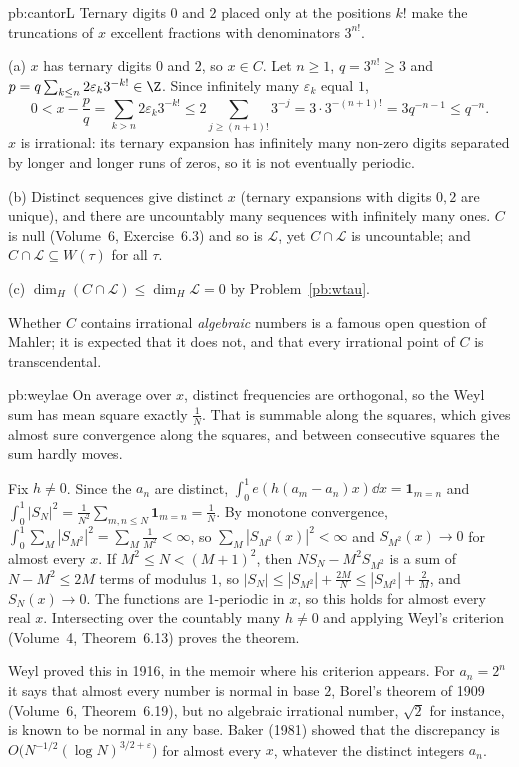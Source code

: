 \begin{solution}{pb:cantorL}
\idea Ternary digits $0$ and $2$ placed only at the positions $k!$ make the truncations of $x$ excellent fractions with denominators $3^{n!}$.

\writeup (a) $x$ has ternary digits $0$ and $2$, so $x\in C$. Let $n\ge1$, $q=3^{n!}\ge3$ and $p=q\sum_{k\le n}2\varepsilon_k3^{-k!}\in\Z$. Since infinitely many $\varepsilon_k$ equal
$1$,
\[
0<x-\frac pq=\sum_{k>n}2\varepsilon_k3^{-k!}\le2\sum_{j\ge(n+1)!}3^{-j}=3\cdot3^{-(n+1)!}=3q^{-n-1}\le q^{-n}.
\]
$x$ is irrational: its ternary expansion has infinitely many non-zero digits separated by longer and longer runs of zeros, so it is not eventually periodic.

(b) Distinct sequences give distinct $x$ (ternary expansions with digits $0,2$ are unique), and there are uncountably many sequences with infinitely many ones. $C$ is null
(Volume~6, Exercise~6.3) and so is $\mathcal L$, yet $C\cap\mathcal L$ is uncountable; and $C\cap\mathcal L\subseteq W(\tau)$ for all $\tau$.

(c) $\dim_H(C\cap\mathcal L)\le\dim_H\mathcal L=0$ by Problem~\ref{pb:wtau}.

\leads Whether $C$ contains irrational \emph{algebraic} numbers is a famous open question of Mahler; it is expected that it does not, and that every irrational point of
$C$ is transcendental.
\end{solution}

\begin{solution}{pb:weylae}
\idea On average over $x$, distinct frequencies are orthogonal, so the Weyl sum has mean square exactly $\frac1N$. That is summable along the squares, which gives
almost sure convergence along the squares, and between consecutive squares the sum hardly moves.

\writeup Fix $h\ne0$. Since the $a_n$ are distinct, $\int_0^1e(h(a_m-a_n)x)\dd x=\mathbf 1_{m=n}$ and $\int_0^1|S_N|^2=\frac1{N^2}\sum_{m,n\le N}\mathbf 1_{m=n}=\frac1N$. By
monotone convergence, $\int_0^1\sum_M|S_{M^2}|^2=\sum_M\frac1{M^2}<\infty$, so $\sum_M|S_{M^2}(x)|^2<\infty$ and $S_{M^2}(x)\to0$ for almost every $x$. If
$M^2\le N<(M+1)^2$, then $NS_N-M^2S_{M^2}$ is a sum of $N-M^2\le2M$ terms of modulus $1$, so $|S_N|\le|S_{M^2}|+\frac{2M}N\le|S_{M^2}|+\frac2M$, and $S_N(x)\to0$. The
functions are $1$-periodic in $x$, so this holds for almost every real $x$. Intersecting over the countably many $h\ne0$ and applying Weyl's criterion (Volume~4,
Theorem~6.13) proves the theorem.

\leads Weyl proved this in 1916, in the memoir where his criterion appears. For $a_n=2^n$ it says that almost every number is normal in base $2$, Borel's theorem of
1909 (Volume~6, Theorem~6.19), but no algebraic irrational number, $\sqrt2$ for instance, is known to be normal in any base. Baker (1981) showed that the discrepancy
is $O\bigl(N^{-1/2}(\log N)^{3/2+\varepsilon}\bigr)$ for almost every $x$, whatever the distinct integers $a_n$.
\end{solution}

